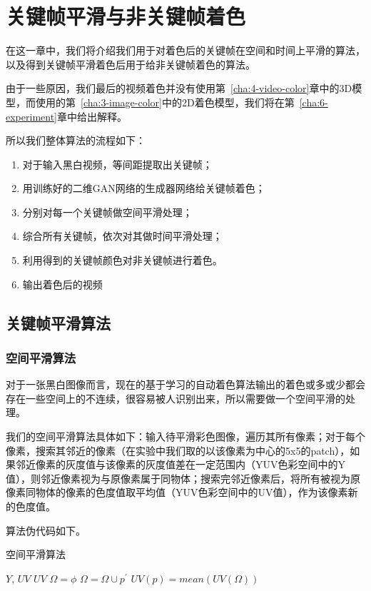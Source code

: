 \chapter{关键帧平滑与非关键帧着色}
\label{cha:5-other-algorithm}

  在这一章中，我们将介绍我们用于对着色后的关键帧在空间和时间上平滑的算法，以及得到关键帧平滑着色后用于给非关键帧着色的算法。

  由于一些原因，我们最后的视频着色并没有使用第~\ref{cha:4-video-color}章中的3D模型，而使用的第~\ref{cha:3-image-color}中的2D着色模型，我们将在第~\ref{cha:6-experiment}章中给出解释。

  所以我们整体算法的流程如下：

  \begin{enumerate}
    \item 对于输入黑白视频，等间距提取出关键帧；
    \item 用训练好的二维GAN网络的生成器网络给关键帧着色；
    \item 分别对每一个关键帧做空间平滑处理；
    \item 综合所有关键帧，依次对其做时间平滑处理；
    \item 利用得到的关键帧颜色对非关键帧进行着色。
    \item 输出着色后的视频
  \end{enumerate}

\section{关键帧平滑算法}
\label{sec:5-keyframe-smooth}

\subsection{空间平滑算法}
\label{sec:5-spatial-smooth}

  对于一张黑白图像而言，现在的基于学习的自动着色算法输出的着色或多或少都会存在一些空间上的不连续，很容易被人识别出来，所以需要做一个空间平滑的处理。

  我们的空间平滑算法具体如下：输入待平滑彩色图像，遍历其所有像素；对于每个像素，搜索其邻近的像素（在实验中我们取的以该像素为中心的5x5的patch），如果邻近像素的灰度值与该像素的灰度值差在一定范围内（YUV色彩空间中的Y值），则邻近像素视为与原像素属于同物体；搜索完邻近像素后，将所有被视为原像素同物体的像素的色度值取平均值（YUV色彩空间中的UV值），作为该像素新的色度值。

  算法伪代码如下。

  \begin{algorithm}[H]
  \label{algo:5-spatial-smooth}
    \caption*{空间平滑算法}
    \begin{algorithmic}[1]
      \Require $Y$, $UV$
      \Ensure  $UV$
          \State $\Omega = \phi$
              \State $\Omega = \Omega \cup p^{'}$
            \EndIf
          \EndFor
          \State $UV(p) = mean(UV(\Omega))$
        \EndFor
      \EndFunction
    \end{algorithmic}
  \end{algorithm}


